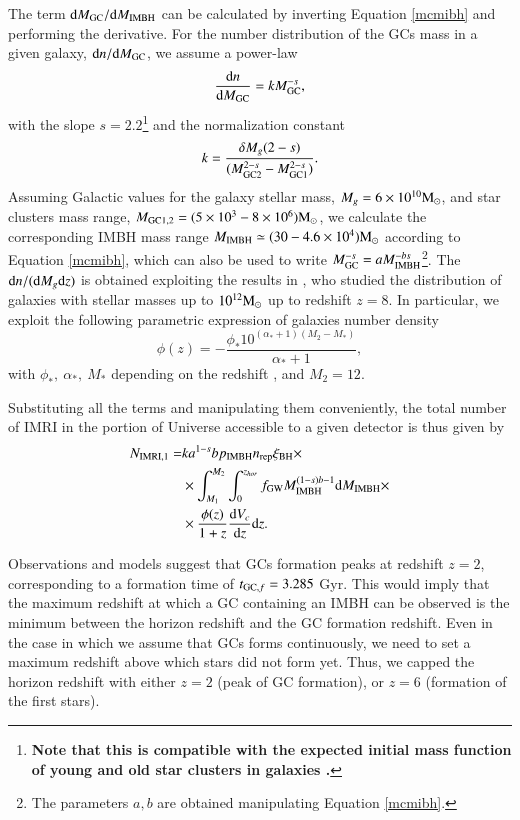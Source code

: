 \documentclass[article]{aa}
\newcommand{\derd}{{\rm d}}
\newcommand{\Ms}{{\rm M}_\odot}
\newcommand{\gw}{{\rm GW}}
\newcommand{\gc}{{\rm GC}}
\newcommand{\ibh}{{\rm IMBH}}
\newcommand{\imri}{{\rm IMRI}}
\newcommand{\bh}{{\rm BH}}
\begin{document}
The term $\derd M_\gc / \derd M_\ibh$ can be calculated by inverting Equation \ref{mcmibh} and performing the derivative. For the number distribution of the GCs mass in a given galaxy, $\derd n/\derd M_\gc$, we assume a power-law
\begin{equation}
\frac{\derd n}{\derd M_\gc} = k M_\gc^{-s},
\end{equation}
with the slope $s = 2.2$\footnote{{\bf Note that this is compatible with the expected initial mass function of young and old star clusters in galaxies \citep[e.g.][]{gieles09}.}} and the normalization constant 
\begin{equation*}
k = \frac{\delta M_g (2-s)}{(M_{\gc 2}^{2-s} - M_{\gc 1}^{2-s})}.
\end{equation*}
Assuming Galactic values for the galaxy stellar mass, $M_g = 6\times 10^{10}\Ms$, and star clusters mass range, $M_{\gc 1,2} = (5\times 10^3 - 8\times 10^6) \Ms$, we calculate the corresponding IMBH mass range $M_\ibh \simeq (30 - 4.6\times 10^4)\Ms$ according to Equation \ref{mcmibh}, which can also be used to write $M_\gc^{-s} = aM_\ibh^{-bs}$\footnote{The parameters $a,b$ are obtained manipulating Equation \ref{mcmibh}.}. The $\derd n/(\derd M_g\derd z)$ is obtained exploiting the results in \cite{conselice16}, who studied the distribution of galaxies with stellar masses up to $10^{12}\Ms$ up to redshift $z=8$. In particular, we exploit the following parametric expression of galaxies number density 
\begin{equation}
\phi(z) = -\frac{\phi_* 10^{(\alpha_* + 1)(M_2-M_*)}}{\alpha_* + 1},
\end{equation}
with $\phi_*,~\alpha_*,~M_*$ depending on the redshift \citep[see Table 1 in][]{conselice16}, and $M_2 = 12$. 

Substituting all the terms and manipulating them conveniently, the total number of IMRI in the portion of Universe accessible to a given detector is thus given by
\begin{align}
N_{\imri,1} = & k a^{1-s} b p_\ibh n_{\rm rep} \xi_\bh \times \nonumber \\
& \times \int_{M_{1}}^{M_{2}} \int_0^{z_{hor}} f_{\gw} M_\ibh^{(1-s)b-1}  \derd M_\ibh \times \nonumber \\
& \times   \frac{\phi(z)}{1+z} \frac{\derd V_c}{\derd z}\derd z .
\label{eq:nimri1}
\end{align}

Observations and models suggest that GCs formation peaks at redshift $z=2$, corresponding to a formation time of $t_{\gc ,f} = 3.285$ Gyr. This would imply that the maximum redshift at which a GC containing an IMBH can be observed is the minimum between the horizon redshift and the GC formation redshift. Even in the case in which we assume that GCs forms continuously, we need to set a maximum redshift above which stars did not form yet. Thus, we capped the horizon redshift with either $z=2$ (peak of GC formation), or $z=6$ (formation of the first stars).
\end{document}
